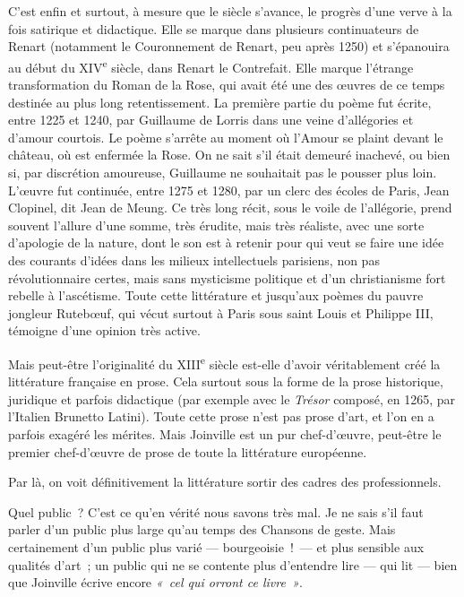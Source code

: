 \documentclass[french,twoside]{book} %
\begin{document}
C’est enfin et surtout, à mesure que le siècle s’avance, le progrès d’une verve à la fois satirique et didactique. Elle se marque dans plusieurs continuateurs de Renart (notamment le Couronnement de Renart, peu après 1250) et s’épanouira au début du XIV\textsuperscript{e} siècle, dans Renart le Contrefait. Elle marque l’étrange transformation du Roman de la Rose, qui avait été une des œuvres de ce temps destinée au plus long retentissement. La première partie du poème fut écrite, entre 1225 et 1240, par Guillaume de Lorris dans une veine d’allégories et d’amour courtois. Le poème s’arrête au moment où l’Amour se plaint devant le château, où est enfermée  
\label{p123} la Rose. On ne sait s’il était demeuré inachevé, ou bien si, par discrétion amoureuse, Guillaume ne souhaitait pas le pousser plus loin. L’œuvre fut continuée, entre 1275 et 1280, par un clerc des écoles de Paris, Jean Clopinel, dit Jean de Meung. Ce très long récit, sous le voile de l’allégorie, prend souvent l’allure d’une somme, très érudite, mais très réaliste, avec une sorte d’apologie de la nature, dont le son est à retenir pour qui veut se faire une idée des courants d’idées dans les milieux intellectuels parisiens, non pas révolutionnaire certes, mais sans mysticisme politique et d’un christianisme fort rebelle à l’ascétisme. Toute cette littérature et jusqu’aux poèmes du pauvre jongleur Rutebœuf, qui vécut surtout à Paris sous saint Louis et Philippe III, témoigne d’une opinion très active.\par
Mais peut-être l’originalité du XIII\textsuperscript{e} siècle est-elle d’avoir véritablement créé la littérature française en prose. Cela surtout sous la forme de la prose historique, juridique et parfois didactique (par exemple avec le {\itshape Trésor} composé, en 1265, par l’Italien Brunetto Latini). Toute cette prose n’est pas prose d’art, et l’on en a parfois exagéré les mérites. Mais Joinville est un pur chef-d’œuvre, peut-être le premier chef-d’œuvre de prose de toute la littérature européenne.\par
Par là, on voit définitivement la littérature sortir des cadres des professionnels.\par
Quel public ? C’est ce qu’en vérité nous savons très mal. Je ne sais s’il faut parler d’un public plus large qu’au temps des Chansons de geste. Mais certainement d’un public plus varié — bourgeoisie ! — et plus sensible aux qualités d’art ; un public qui ne se contente plus d’entendre lire — qui lit — bien que Joinville écrive encore \emph{« cel qui orront ce livre »}.\par
\end{document}
